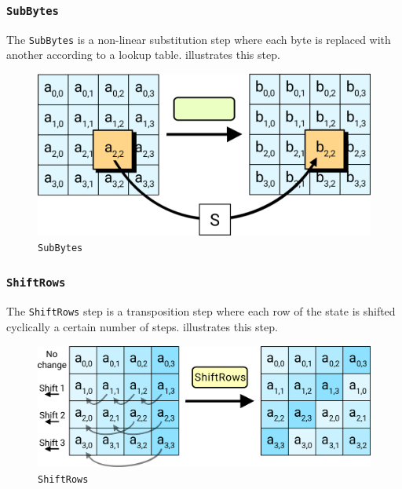 \subsubsection{\texttt{SubBytes}}\label{subsubsec:AES-SubBytes}
The \texttt{SubBytes} is a non-linear substitution step where each byte is replaced with another according to a lookup table.
 illustrates this step.
\begin{figure}[h!]
  \centering
  \includegraphics[scale=0.35]{./Drawings/EDIN01-Cryptography/AES-1-SubBytes.png}
  \caption{ \texttt{SubBytes}}
  \label{fig:AES_SubBytes}
\end{figure}

\subsubsection{\texttt{ShiftRows}}\label{subsubsec:AES-ShiftRows}
The \texttt{ShiftRows} step is a transposition step where each row of the state is shifted cyclically a certain number of steps.
 illustrates this step.
\begin{figure}[h!]
  \centering
  \includegraphics[scale=0.35]{./Drawings/EDIN01-Cryptography/AES-2-ShiftRows.png}
  \caption{ \texttt{ShiftRows}}
  \label{fig:AES_ShiftRows}
\end{figure}

